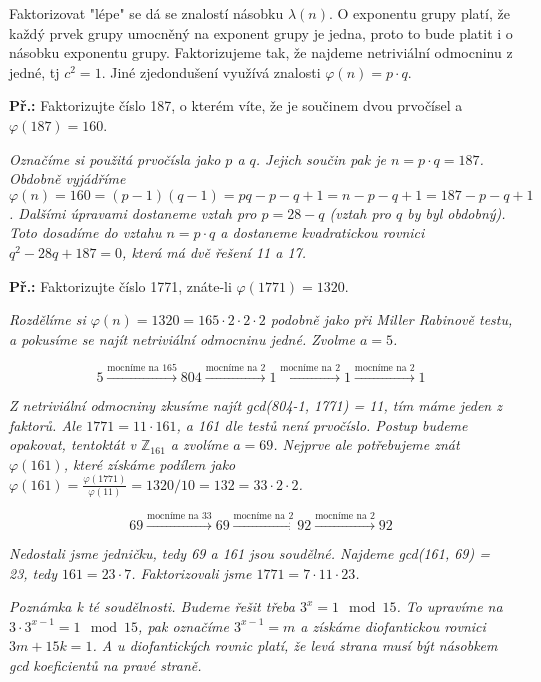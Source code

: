 \documentclass[10pt,a4paper]{article}
\begin{document}
Faktorizovat "lépe" se dá se znalostí násobku $\lambda(n)$. O exponentu grupy platí, že každý prvek grupy umocněný na exponent grupy je jedna, proto to bude platit i o násobku exponentu grupy. Faktorizujeme tak, že najdeme netriviální odmocninu z jedné, tj $c^2 = 1$. Jiné zjedondušení využívá znalosti $\varphi(n) = p \cdot q$.

\textbf{Př.:} Faktorizujte číslo 187, o kterém víte, že je součinem dvou prvočísel a $\varphi(187) = 160$.

\textit{Označíme si použitá prvočísla jako $p$ a $q$. Jejich součin pak je $n = p \cdot q = 187$. Obdobně vyjádříme $\varphi(n) = 160 = (p-1)(q-1) = pq - p - q + 1 = n - p - q + 1 = 187 - p - q + 1$. Dalšími úpravami dostaneme vztah pro $p = 28 - q$ (vztah pro $q$ by byl obdobný). Toto dosadíme do vztahu $n = p\cdot q$ a dostaneme kvadratickou rovnici $q^2 - 28q + 187 = 0$, která má dvě řešení 11 a 17.}

\textbf{Př.:} Faktorizujte číslo 1771, znáte-li $\varphi(1771) = 1320$.

\textit{Rozdělíme si $\varphi(n) = 1320 = 165 \cdot 2 \cdot 2 \cdot 2$ podobně jako při Miller Rabinově testu, a pokusíme se najít netriviální odmocninu jedné. Zvolme $a = 5$.}

$$ 5 \xrightarrow{\text{mocníme na 165}} 804 \xrightarrow{\text{mocníme na 2}} 1 \xrightarrow{\text{mocníme na 2}} 1 \xrightarrow{\text{mocníme na 2}} 1$$

\textit{Z netriviální odmocniny zkusíme najít gcd(804-1, 1771) = 11, tím máme jeden z faktorů. Ale $1771 = 11 \cdot 161$, a 161 dle testů není prvočíslo. Postup budeme opakovat, tentoktát v $\mathbb{Z}_{161}$ a zvolíme $a = 69$. Nejprve ale potřebujeme znát $\varphi(161)$, které získáme podílem jako $\varphi(161) = \frac{\varphi(1771)}{\varphi(11)} = 1320/10 = 132 = 33 \cdot 2 \cdot 2$.}

$$69 \xrightarrow{\text{mocníme na 33}} 69 \xrightarrow{\text{mocníme na 2}} 92 \xrightarrow{\text{mocníme na 2}} 92$$

\textit{Nedostali jsme jedničku, tedy 69 a 161 jsou soudělné. Najdeme gcd(161, 69) = 23, tedy $161 = 23 \cdot 7$. Faktorizovali jsme $1771 = 7 \cdot 11 \cdot 23$.}

\textit{Poznámka k té soudělnosti. Budeme řešit třeba $3^x = 1 \mod 15$. To upravíme na $3\cdot 3^{x-1} = 1 \mod 15$, pak označíme $3^{x-1} = m$ a získáme diofantickou rovnici $3m + 15k = 1$. A u diofantických rovnic platí, že levá strana musí být násobkem gcd koeficientů na pravé straně.}
\end{document}
